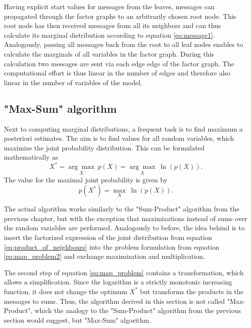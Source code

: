 \documentclass{sigkdd}
\begin{document}
Having explicit start values for messages from the leaves, messages can propagated through the factor graphs to an arbitrarily chosen root node. This root node has then received messages from all its neighbors and can thus calculate its marginal distribution according to equation \ref{eq:message1}. Analogously, passing all messages back from the root to all leaf nodes enables to calculate the marginals of all variables in the factor graph. During this calculation two messages are sent via each edge edge of the factor graph. The computational effort is thus linear in the number of edges and therefore also linear in the number of variables of the model.\\

\subsection{"Max-Sum" algorithm}
Next to computing marginal distributions, a frequent task is to find maximum a posteriori estimates. The aim is to find values for all random variables, which maximize the joint probability distribution. This can be formulated mathematically as
\begin{equation}\label{eq:map_problem}
X^* = \underset{X}{\arg\max}~ p(X) = \underset{X}{\arg\max}~ \ln (p(X)).
\end{equation}
The value for the maximal joint probability is given by
\begin{equation}\label{eq:map_problem2}
p(X^*) = \underset{X}{\max}~ \ln (p(X)).
\end{equation}


The actual algorithm works similarly to the "Sum-Product" algorithm from the previous chapter, but with the exception that maximizations instead of sums over the random variables are performed. Analogously to before, the idea behind is to insert the factorized expression of the joint distribution from equation \ref{eq:product_of_neighbours} into the problem formulation from equation \ref{eq:map_problem2} and exchange maximization and multiplication.

The second step of equation \ref{eq:map_problem} contains a transformation, which allows a simplification. Since the logarithm is a strictly monotonic increasing function, it does not change the optimum $X^*$ but transforms the products in the messages to sums. Thus, the algorithm derived in this section is not called "Max-Product", which the analogy to the "Sum-Product" algorithm from the previous section would suggest, but "Max-Sum" algorithm.
\end{document}
